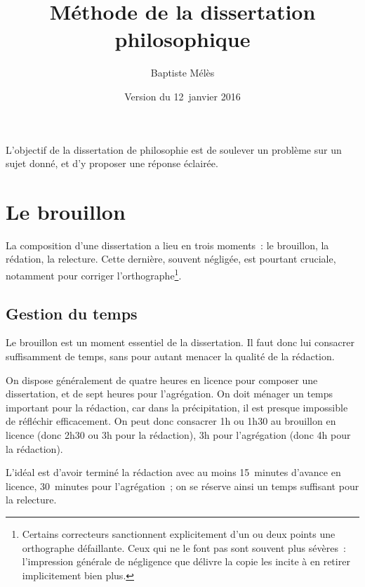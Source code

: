 \documentclass[a4paper,11pt]{article}
\author{Baptiste Mélès}
\title{Méthode de la dissertation philosophique}
\date{Version du 12~janvier 2016}
\begin{document}
\maketitle

L'objectif de la dissertation de philosophie est de soulever un problème
sur un sujet donné, et d'y proposer une réponse éclairée.


\tableofcontents

\par


\section{Le brouillon}

La composition d'une dissertation a lieu en trois moments~: le
brouillon, la rédation, la relecture. Cette dernière, souvent négligée,
est pourtant cruciale, notamment pour corriger
l'orthographe\footnote{Certains correcteurs sanctionnent explicitement
  d'un ou deux points une orthographe défaillante. Ceux qui ne le font
  pas sont souvent plus sévères~: l'impression générale de négligence
  que délivre la copie les incite à en retirer implicitement bien
  plus.}.

\par

\subsection{Gestion du temps}

Le brouillon est un moment essentiel de la dissertation. Il faut donc
lui consacrer suffisamment de temps, sans pour autant menacer la qualité
de la rédaction.

\par

On dispose généralement de quatre heures en licence pour composer une
dissertation, et de sept heures pour l'agrégation. On doit ménager un
temps important pour la rédaction, car dans la précipitation, il est
presque impossible de réfléchir efficacement. On peut donc consacrer 1h
ou 1h30 au brouillon en licence (donc 2h30 ou 3h pour la rédaction), 3h
pour l'agrégation (donc 4h pour la rédaction).

\par

L'idéal est d'avoir terminé la rédaction avec au moins 15~minutes
d'avance en licence, 30~minutes pour l'agrégation~; on se réserve ainsi
un temps suffisant pour la relecture.
\end{document}
